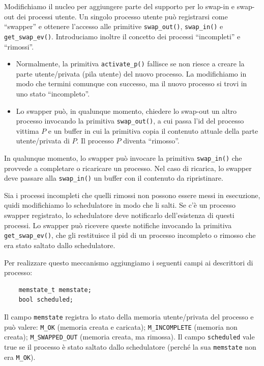 Modifichiamo il nucleo per aggiungere parte del supporto per lo
swap-in e swap-out dei processi utente.  Un singolo processo utente
pu\`o registrarsi come ``swapper'' e ottenere l'accesso alle primitive
\verb|swap_out()|, \verb|swap_in()| e \verb|get_swap_ev()|.
Introduciamo inoltre il concetto dei processi ``incompleti'' e ``rimossi''.

\begin{itemize}
\item
Normalmente, la primitiva \verb|activate_p()| fallisce se non riesce
a creare la parte utente/privata (pila utente) del nuovo processo.
La modifichiamo in modo che termini comunque con successo, ma il
nuovo processo si trovi in uno stato ``incompleto''.

\item
Lo swapper pu\`o, in qualunque momento, chiedere lo swap-out un
altro processo invocando la primitiva \verb|swap_out()|, a cui passa
l'id del processo vittima $P$ e un buffer in cui la primitiva copia
il contenuto attuale della parte utente/privata di $P$. Il processo
$P$ diventa ``rimosso''.
\end{itemize}

In qualunque momento, lo swapper pu\`o
invocare la primitiva \verb|swap_in()| che provvede a completare o
ricaricare un processo. Nel caso di ricarica, lo swapper deve passare
alla \verb|swap_in()| un buffer con il contenuto da ripristinare.

Sia i processi incompleti che quelli rimossi non possono essere messi
in esecuzione, quidi modifichiamo lo schedulatore in modo che li salti.
Se c'\`e un processo swapper registrato, lo schedulatore deve notificarlo
dell'esistenza di questi processi.  Lo swapper pu\`o ricevere queste
notifiche invocando la primitiva \verb|get_swap_ev()|, che gli restituisce
il pid di un processo incompleto o rimosso che era stato saltato dallo
schedulatore.

Per realizzare questo meccanismo aggiungiamo i seguenti campi ai
descrittori di processo:
\begin{verbatim}
    memstate_t memstate;
    bool scheduled;
\end{verbatim}
Il campo \verb|memstate| registra lo stato della memoria utente/privata
del processo e pu\`o valere: \verb|M_OK| (memoria creata e caricata);
\verb|M_INCOMPLETE| (memoria non creata); \verb|M_SWAPPED_OUT|
(memoria creata, ma rimossa).  Il campo \verb|scheduled| vale true
se il processo \`e stato saltato dallo schedulatore (perch\'e la
sua \verb|memstate| non era \verb|M_OK|).

